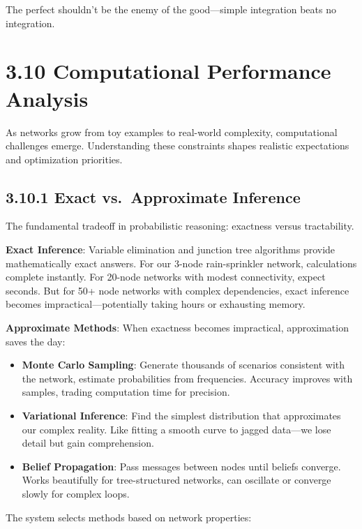 \documentclass[
  11pt,
  letterpaper,
]{book}
\providecommand{\tightlist}{%
  \setlength{\itemsep}{0pt}\setlength{\parskip}{0pt}}
\begin{document}
The perfect shouldn't be the enemy of the good---simple integration
beats no integration.

\section{3.10 Computational Performance
Analysis}\label{sec-computational-performance}

As networks grow from toy examples to real-world complexity,
computational challenges emerge. Understanding these constraints shapes
realistic expectations and optimization priorities.

\subsection{3.10.1 Exact vs.~Approximate
Inference}\label{sec-exact-approximate}

The fundamental tradeoff in probabilistic reasoning: exactness versus
tractability.

\textbf{Exact Inference}: Variable elimination and junction tree
algorithms provide mathematically exact answers. For our 3-node
rain-sprinkler network, calculations complete instantly. For 20-node
networks with modest connectivity, expect seconds. But for 50+ node
networks with complex dependencies, exact inference becomes
impractical---potentially taking hours or exhausting memory.

\textbf{Approximate Methods}: When exactness becomes impractical,
approximation saves the day:

\begin{itemize}
\tightlist
\item
  \textbf{Monte Carlo Sampling}: Generate thousands of scenarios
  consistent with the network, estimate probabilities from frequencies.
  Accuracy improves with samples, trading computation time for
  precision.
\item
  \textbf{Variational Inference}: Find the simplest distribution that
  approximates our complex reality. Like fitting a smooth curve to
  jagged data---we lose detail but gain comprehension.
\item
  \textbf{Belief Propagation}: Pass messages between nodes until beliefs
  converge. Works beautifully for tree-structured networks, can
  oscillate or converge slowly for complex loops.
\end{itemize}

The system selects methods based on network properties:
\end{document}
